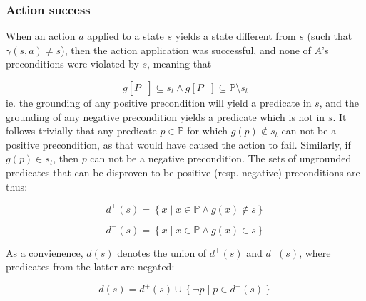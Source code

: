 \documentclass[../../Master.tex]{subfiles}
\begin{document}
\subsubsection*{Action success}
When an action $a$ applied to a state $s$ yields a state different from $s$ (such that $\gamma (s, a) \neq s$), then the action application was successful, and none of $A$'s preconditions were violated by $s$, meaning that

        \[ g\left[P^+\right] \subseteq s_t \land
            g\left[P^-\right] \subseteq \mathbb{P} \setminus s_t
        \]
ie. the grounding of any positive precondition will yield a predicate in $s$, and the grounding of any negative precondition yields a predicate which is not in $s$.
It follows trivially that any predicate $p \in \mathbb{P}$ for which $g(p) \notin s_t$ can not be a positive precondition, as that would have caused the action to fail. Similarly, if $g(p) \in s_t$, then $p$ can not be a negative precondition. The sets of ungrounded predicates that can be disproven to be positive (resp. negative) preconditions are thus:

\begin{equation*} \label{eq:DPlusTrans}
    d^+ (s) = \left\{ x \; | \; x \in \mathbb{P} \land g(x) \notin s \right\}
\end{equation*}

\begin{equation*} \label{eq:DMinusTrans}
    d^- (s) = \left\{ x \; | \; x \in \mathbb{P} \land g(x) \in s \right\}
\end{equation*}

As a convienence, $d(s)$ denotes the union of $d^+(s)$ and $d^-(s)$, where predicates from the latter are negated:

\begin{equation*}
    d(s) = d^+ (s) \cup \left\{ \neg p \; | \; p \in d^-(s) \right\}
\end{equation*}
\end{document}
